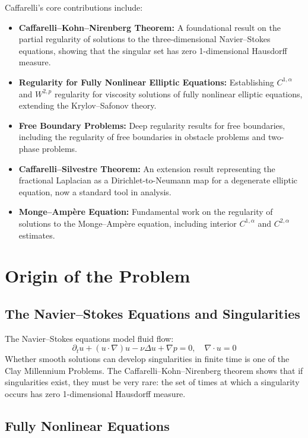Caffarelli's core contributions include:
\begin{itemize}
    \item \textbf{Caffarelli--Kohn--Nirenberg Theorem:} A foundational result on the partial regularity of solutions to the three-dimensional Navier--Stokes equations, showing that the singular set has zero 1-dimensional Hausdorff measure.
    \item \textbf{Regularity for Fully Nonlinear Elliptic Equations:} Establishing $C^{1,\alpha}$ and $W^{2,p}$ regularity for viscosity solutions of fully nonlinear elliptic equations, extending the Krylov--Safonov theory.
    \item \textbf{Free Boundary Problems:} Deep regularity results for free boundaries, including the regularity of free boundaries in obstacle problems and two-phase problems.
    \item \textbf{Caffarelli--Silvestre Theorem:} An extension result representing the fractional Laplacian as a Dirichlet-to-Neumann map for a degenerate elliptic equation, now a standard tool in analysis.
    \item \textbf{Monge--Amp\`ere Equation:} Fundamental work on the regularity of solutions to the Monge--Amp\`ere equation, including interior $C^{1,\alpha}$ and $C^{2,\alpha}$ estimates.
\end{itemize}

\section{Origin of the Problem}

\subsection{The Navier--Stokes Equations and Singularities}

The Navier--Stokes equations model fluid flow:
\[
\partial_t u + (u \cdot \nabla) u - \nu \Delta u + \nabla p = 0, \quad \nabla \cdot u = 0
\]
Whether smooth solutions can develop singularities in finite time is one of the Clay Millennium Problems. The Caffarelli--Kohn--Nirenberg theorem shows that if singularities exist, they must be very rare: the set of times at which a singularity occurs has zero 1-dimensional Hausdorff measure.

\subsection{Fully Nonlinear Equations}

